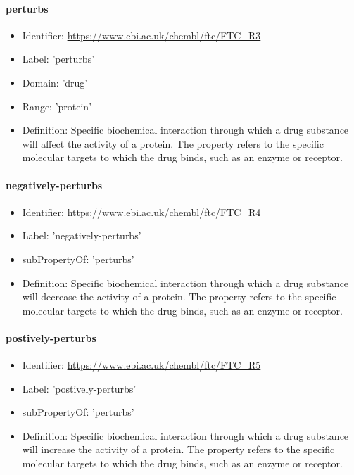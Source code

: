 \paragraph{perturbs}
\begin{itemize}
  \item Identifier: \url{https://www.ebi.ac.uk/chembl/ftc/FTC\_R3}
  \item Label: 'perturbs'
  \item Domain: 'drug'
  \item Range: 'protein'
  \item Definition: Specific biochemical interaction through which a drug substance will affect the activity of a protein. The property refers to the specific molecular targets to which the drug binds, such as an enzyme or receptor.
\end{itemize}

\paragraph{negatively-perturbs}
\begin{itemize}
  \item Identifier: \url{https://www.ebi.ac.uk/chembl/ftc/FTC\_R4}
  \item Label: 'negatively-perturbs'
  \item subPropertyOf: 'perturbs'
  \item Definition: Specific biochemical interaction through which a drug substance will decrease the activity of a protein. The property refers to the specific molecular targets to which the drug binds, such as an enzyme or receptor.
\end{itemize}

\paragraph{postively-perturbs}
\begin{itemize}
  \item Identifier: \url{https://www.ebi.ac.uk/chembl/ftc/FTC\_R5}
  \item Label: 'postively-perturbs'
  \item subPropertyOf: 'perturbs'
  \item Definition: Specific biochemical interaction through which a drug substance will increase the activity of a protein. The property refers to the specific molecular targets to which the drug binds, such as an enzyme or receptor.
\end{itemize}

